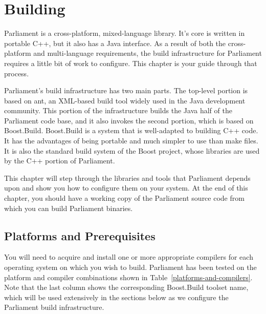 
\chapter{Building \protect\pmnt}
\label{chapter-building-parliament}

Parliament is a cross-platform, mixed-language library.  It's core is written in portable C++, but it also has a Java interface.  As a result of both the cross-platform and multi-language requirements, the build infrastructure for Parliament requires a little bit of work to configure.  This chapter is your guide through that process.

Parliament's build infrastructure has two main parts.  The top-level portion is based on ant, an XML-based build tool widely used in the Java development community.  This portion of the infrastructure builds the Java half of the Parliament code base, and it also invokes the second portion, which is based on Boost.Build.  Boost.Build is a system that is well-adapted to building C++ code.  It has the advantages of being portable and much simpler to use than make files.  It is also the standard build system of the Boost project, whose libraries are used by the C++ portion of Parliament.

This chapter will step through the libraries and tools that Parliament depends upon and show you how to configure them on your system.  At the end of this chapter, you should have a working copy of the Parliament source code from which you can build Parliament binaries.

\section{Platforms and Prerequisites}

You will need to acquire and install one or more appropriate compilers for each operating system on which you wish to build.  Parliament has been tested on the platform and compiler combinations shown in Table~\ref{platforms-and-compilers}.  Note that the last column shows the corresponding Boost.Build toolset name, which will be used extensively in the sections below as we configure the Parliament build infrastructure.

